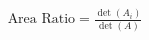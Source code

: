 \documentclass[preview]{standalone}
\begin{document}
\begin{align*}
\text{Area Ratio} = \frac{\det(A_i)}{\det(A)}
\end{align*}
\end{document}
